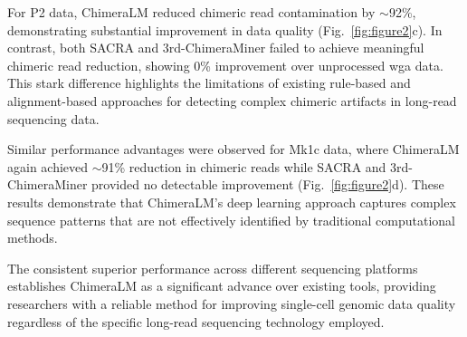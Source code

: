 \documentclass[pdflatex,sn-nature]{sn-jnl}%
\theoremstyle{thmstyleone}%
\theoremstyle{thmstyletwo}%
\theoremstyle{thmstylethree}%
\begin{document}
For P2 data, ChimeraLM reduced chimeric read contamination by $\sim$92\%, demonstrating substantial improvement in data quality (Fig.~\ref{fig:figure2}c).
In contrast, both SACRA and 3rd-ChimeraMiner failed to achieve meaningful chimeric read reduction, showing 0\% improvement over unprocessed \gls{wga} data.
This stark difference highlights the limitations of existing rule-based and alignment-based approaches for detecting complex chimeric artifacts in long-read sequencing data.

Similar performance advantages were observed for Mk1c data, where ChimeraLM again achieved $\sim$91\% reduction in chimeric reads while SACRA and 3rd-ChimeraMiner provided no detectable improvement (Fig.~\ref{fig:figure2}d).
These results demonstrate that ChimeraLM's deep learning approach captures complex sequence patterns that are not effectively identified by traditional computational methods.

The consistent superior performance across different sequencing platforms establishes ChimeraLM as a significant advance over existing tools, providing researchers with a reliable method for improving single-cell genomic data quality regardless of the specific long-read sequencing technology employed.
\end{document}
